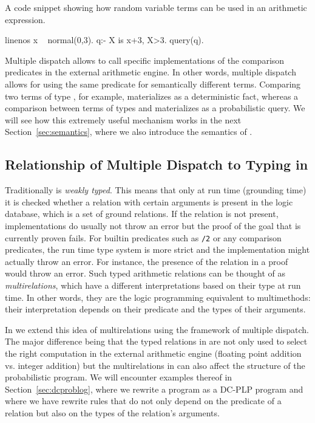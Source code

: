 \begin{example}\label{ex:is} A \dcproblogsty code snippet showing how random variable terms can be used in an arithmetic expression. 
	\begin{problog*}{linenos}
x ~ normal(0,3).
q:- X is x+3, X>3.
query(q).
	\end{problog*}
\end{example}

Multiple dispatch allows \dcproblogsty to call specific implementations of the comparison predicates in the external arithmetic engine.
In other words, multiple dispatch allows for using the same predicate for semantically different terms.
Comparing two terms of type , for example, materializes as a deterministic fact, whereas a comparison between terms of types  and  materializes as a probabilistic query. We will see how this extremely useful mechanism works in the next Section~\ref{sec:semantics}, where we also introduce the semantics of \dcproblogsty.




\subsection{Relationship of Multiple Dispatch to Typing in \prologsty}

Traditionally \prologsty is {\em weakly typed}. This means that only at run time (grounding time) it is checked whether a relation with certain arguments is present in the logic database, which is a set of ground relations. If the relation is not present, \prologsty implementations do usually not throw an error but the proof of the goal that is currently proven fails. For builtin predicates such as \lstinline[columns=fixed]|/2| or any comparison predicates, the run time type system is more strict and the \prologsty implementation might actually throw an error. For instance, the presence of the relation  in a proof would throw an error.
Such typed arithmetic relations can be thought of as {\em multirelations}, which have a different interpretations based on their type at run time. In other words, they are the logic programming equivalent to multimethods: their interpretation depends on their predicate and the types of their arguments. 

In \dcproblogsty we extend this idea of multirelations using the framework of multiple dispatch. The major difference being that the typed relations in \dcproblogsty are not only used to select the right computation in the external arithmetic engine (\eg floating point addition vs. integer addition) but the multirelations in \dcproblogsty can also affect the structure of the probabilistic program. We will encounter examples thereof in Section~\ref{sec:dcproblog}, where we rewrite a \dcproblogsty program as a DC-PLP program and where we have rewrite rules that do not only depend on the predicate of a relation but also on the types of the relation's arguments.

